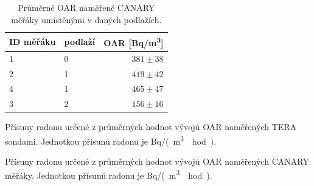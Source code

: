 \begin{table}[H]
    \centering
    \caption{Průměrné OAR naměřené CANARY měřáky umístěnými v daných podlažích.}
    \label{tab:skala75_OARprumerne_CANARY}
    \begin{tabular}{llr
        }
        \toprule
        ID měřáku & podlaží & OAR [\si{Bq/m^3}]\\
        \midrule
        1 & 0 & $381\pm38$\\
        2 & 1 & $419\pm42$\\
        4 & 1 & $465\pm47$\\
        3 & 2 & $156\pm16$\\
        \bottomrule
    \end{tabular}
\end{table}

\begin{table}[H]
    \centering
    \caption{Přísuny radonu určené z průměrných hodnot vývojů OAR naměřených TERA sondami. Jednotkou přísunů radonu je \si{Bq/(m^3\cdot hod)}.}
    \label{tab:skala75_prisunyRovnovazne}
   
\end{table}

\begin{table}[H]
    \centering
    \caption{Přísuny radonu určené z průměrných hodnot vývojů OAR naměřených CANARY měřáky. Jednotkou přísunů radonu je \si{Bq/(m^3\cdot hod)}.}
    \label{tab:skala75_prisunyRovnovazneCANARY}
   
\end{table}


